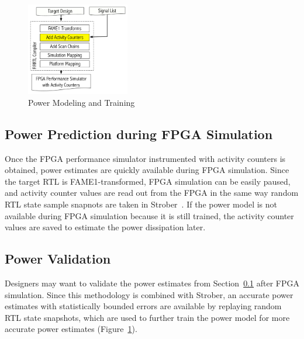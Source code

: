 \begin{figure}[!ht]
	\centering
	\includegraphics[width=0.4\textwidth,height=\textheight,keepaspectratio]{images/instrumentation.pdf}
	\caption{Power Modeling and Training}
	\label{fig:power_modeling}
\end{figure}

\subsection{Power Prediction during FPGA Simulation}
\label{sec:power_prediction}
Once the FPGA performance simulator instrumented with activity counters is obtained,
power estimates are quickly available during FPGA simulation. Since the target RTL
is FAME1-transformed, FPGA simulation can be easily paused, and activity counter
values are read out from the FPGA in the same way random RTL state sample snapnots
are taken in Strober~\cite{Kim2016}. If the power model is not available during
FPGA simulation because it is still trained, the activity counter values are saved
to estimate the power dissipation later.

\subsection{Power Validation}
\label{sec:power_validation}
Designers may want to validate the power estimates from Section~\ref{sec:power_prediction}
after FPGA simulation. Since this methodology is combined with Strober,
an accurate power estimates with statistically bounded errors are available by
replaying random RTL state snapshots, which are used to further train the power model
for more accurate power estimates (Figure~\ref{fig:power_modeling}).
